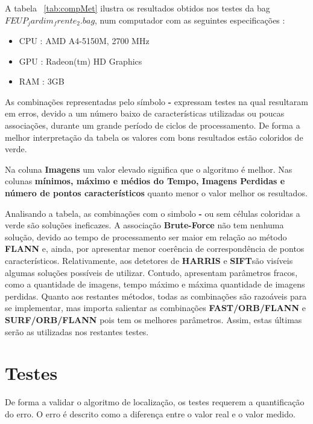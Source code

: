 A tabela ~\ref{tab:compMet} ilustra os resultados obtidos nos testes da bag \textit{$FEUP_jardim_frente_2.bag$}, num computador com as seguintes especificações :
\begin{itemize}
	\item CPU : AMD A4-5150M, 2700 MHz
	\item GPU : Radeon(tm) HD Graphics
	\item RAM : 3GB 
\end{itemize}


 As combinações representadas pelo símbolo \textbf{-} expressam testes na qual resultaram em erros, devido a um número baixo de características utilizadas ou poucas associações, durante um grande período de ciclos de processamento. De forma a melhor interpretação da tabela os valores com bons resultados estão coloridos de verde. 


Na coluna \textbf{Imagens} um valor elevado significa que o algoritmo é melhor. Nas colunas \textbf{mínimos, máximo e médios do Tempo, Imagens Perdidas e número de pontos característicos} quanto menor o valor melhor os resultados. 

Analisando a tabela, as combinações com o simbolo \textbf{-} ou sem células coloridas a verde são soluções ineficazes. A associação \textbf{Brute-Force} não tem nenhuma solução, devido ao tempo de processamento ser maior em relação ao método \textbf{FLANN} e, ainda, por apresentar menor coerência de correspondência de pontos característicos. Relativamente, aos detetores de \textbf{HARRIS} e \textbf{SIFT}são visíveis algumas soluções possíveis de utilizar. Contudo, apresentam parâmetros fracos, como a quantidade de imagens, tempo máximo e máxima quantidade de imagens perdidas. Quanto aos restantes métodos, todas as combinações são razoáveis para se implementar, mas importa salientar as combinações \textbf{FAST/ORB/FLANN} e \textbf{SURF/ORB/FLANN} pois tem os melhores parâmetros. Assim, estas últimas serão as utilizadas nos restantes testes.








\section{Testes}

De forma a validar o algoritmo de localização, os testes requerem a quantificação do erro. O erro é descrito como a diferença entre o valor real e o valor medido.

